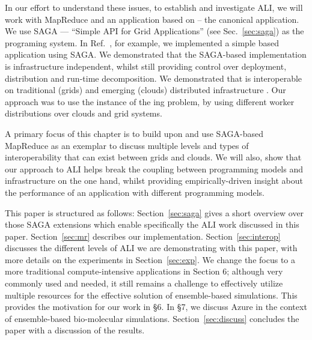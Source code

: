 \documentclass[graybox]{svmult}
\begin{document}

In our effort to understand these issues, to establish and investigate
ALI, we will work with MapReduce and an application based on \mr --
the canonical \wc application.  We use SAGA --- “Simple API for Grid
Applications'' (see Sec.~\ref{sec:saga}) as the programing system.  In
Ref.~\cite{saga_ccgrid09}, for example, we implemented a simple \mr
based \wc application using SAGA.  We demonstrated that the SAGA-based
implementation is infrastructure independent, whilst still providing
control over deployment, distribution and run-time decomposition.
We demonstrated that \sagamapreduce is interoperable on traditional
(grids) and emerging (clouds) distributed infrastructure
.  Our approach was to %
use the  %
instance of the {\wc}ing problem, by using different worker
distributions over clouds and grid systems.

A primary focus of this chapter is to build upon and use SAGA-based
MapReduce as an exemplar to discuss multiple levels and types of
interoperability that can exist between grids and clouds. We will
also, show that our approach to ALI helps break the coupling between
programming models and infrastructure on the one hand, whilst
providing empirically-driven insight about the performance of an
application with different programming models.



This paper is structured as follows: Section~\ref{sec:saga} gives a
short overview over those SAGA extensions which enable specifically
the ALI work discussed in this paper.  Section~\ref{sec:mr} describes
our \smr implementation.  Section~\ref{sec:interop} discusses the
different levels of ALI we are demonstrating with this paper, with
more details on the experiments in Section~\ref{sec:exp}.  We change
the focus to a more traditional compute-intensive applications in
Section 6; although very commonly used and needed, it still remains a
challenge to effectively utilize multiple resources for the effective
solution of ensemble-based simulations. This provides the motivation
for our work in \S6. In \S7, we discuss Azure in the context of
ensemble-based bio-molecular simulations. Section~\ref{sec:discuss}
concludes the paper with a discussion of the results.
\end{document}
